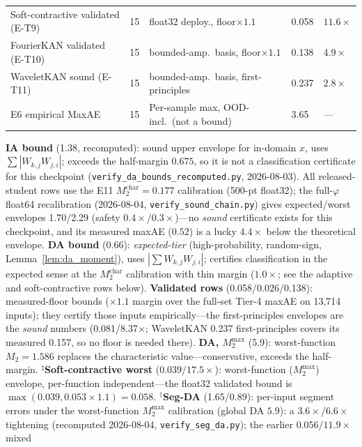 \documentclass[journal,onecolumn]{IEEEtran}
\begin{document}
\begin{table}[t]
\begin{tabular}{@{}lllll@{}}
Soft-contractive validated (E-T9) & 15 & float32 deploy., floor${\times}1.1$ & 0.058 & $11.6\times$ \\
FourierKAN validated (E-T10) & 15 & bounded-amp.\ basis, floor${\times}1.1$ & 0.138 & $4.9\times$ \\
WaveletKAN sound (E-T11) & 15 & bounded-amp.\ basis, first-principles & 0.237 & $2.8\times$ \\
E6 empirical MaxAE        & 15 & Per-sample max, OOD-incl.\ (not a bound) & 3.65 & --- \\
\bottomrule
\end{tabular}
\vspace{2pt}
{\scriptsize
\textbf{IA bound} (1.38, recomputed): sound upper envelope for in-domain
$x$, uses $\sum|W_{k,j}W_{j,i}|$; exceeds the half-margin $0.675$, so it
is not a classification certificate for this checkpoint
(\texttt{verify\_da\_bounds\_recomputed.py}, 2026-08-03).
All released-student rows use the E11 $M_2^{\text{char}} = 0.177$
calibration (500-pt float32); the full-$\varphi$ float64 recalibration
(2026-08-04, \texttt{verify\_sound\_chain.py}) gives expected/worst
envelopes 1.70/2.29 (safety $0.4\times$/$0.3\times$)---no \emph{sound}
certificate exists for this checkpoint, and its measured maxAE ($0.52$)
is a lucky $4.4\times$ below the theoretical envelope.
\textbf{DA bound} (0.66): \emph{expected-tier} (high-probability,
random-sign, Lemma~\ref{lem:da_moment}), uses $|\sum W_{k,j}W_{j,i}|$;
certifies classification in the expected sense at the
$M_2^{\text{char}}$ calibration with thin margin ($1.0\times$; see the
adaptive and soft-contractive rows below). \textbf{Validated rows}
(0.058/0.026/0.138): measured-floor bounds ($\times 1.1$ margin over the
full-set Tier-4 maxAE on 13{,}714 inputs); they certify those inputs
empirically---the first-principles envelopes are the \emph{sound}
numbers (0.081/8.37$\times$; WaveletKAN 0.237 first-principles covers
its measured 0.157, so no floor is needed there).
\textbf{DA, $M_2^{\max}$} (5.9): worst-function $M_2=1.586$ replaces the
characteristic value---conservative, exceeds the half-margin.
$^{\natural}$\textbf{Soft-contractive worst} (0.039/$17.5\times$):
worst-function ($M_2^{\max}$) envelope, per-function independent---the
float32 validated bound is $\max(0.039, 0.053\times1.1) = 0.058$.
$^{\dag}$\textbf{Seg-DA} (1.65/0.89): per-input segment errors under the
worst-function $M_2^{\max}$ calibration (global DA $5.9$): a
$3.6\times$/$6.6\times$ tightening (recomputed 2026-08-04,
\texttt{verify\_seg\_da.py}); the earlier $0.056/11.9\times$ mixed
}
\end{table}
\end{document}
